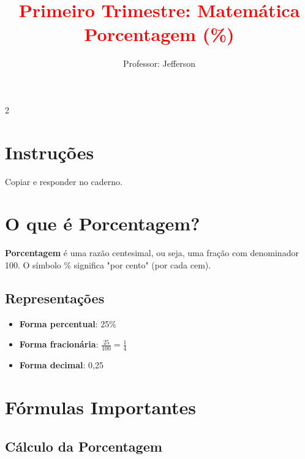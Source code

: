 \documentclass[11pt]{article}
\title{\textcolor{red}{Primeiro Trimestre: Matemática
    \\Porcentagem (\%)}}
\author{Professor: Jefferson}
\date{}
\begin{document}
\maketitle
\vspace{-1cm}

\begin{multicols}{2}

\section*{Instruções}
Copiar e responder no caderno.

\section*{O que é Porcentagem?}

\textbf{Porcentagem} é uma razão centesimal, ou seja, uma fração com denominador 100. O símbolo \% significa "por cento" (por cada cem).


\subsection*{Representações}
\begin{itemize}
\item \textbf{Forma percentual}: 25\%
\item \textbf{Forma fracionária}: $\frac{25}{100} = \frac{1}{4}$
\item \textbf{Forma decimal}: 0,25
\end{itemize}

\section*{Fórmulas Importantes}

\subsection*{Cálculo da Porcentagem}



\end{multicols}
\end{document}
